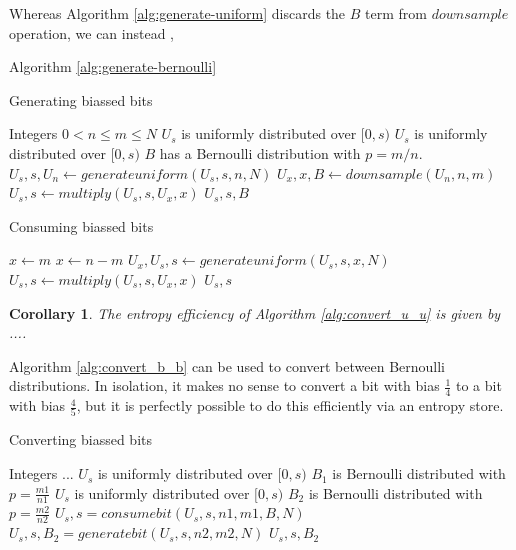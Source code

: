 \documentclass[12pt]{article}
\newtheorem{corollary}{Corollary}
\begin{document}
Whereas Algorithm \ref{alg:generate-uniform} discards the $B$ term from $downsample$ operation, we can instead , 

Algorithm \ref{alg:generate-bernoulli}

\begin{algorithm}
\caption{Generating biassed bits}
\label{alg:generate-bernoulli}
\begin{algorithmic}[1]
\Require Integers $0 < n \le m \le N$
\Require $U_s$ is uniformly distributed over $[0,s)$
\Ensure $U_s$ is uniformly distributed over $[0,s)$
\Ensure $B$ has a Bernoulli distribution with $p = m/n$.
    \State $U_s, s, U_n \gets generateuniform(U_s, s, n, N)$
    \State $U_x, x, B \gets downsample(U_n, n, m)$
    \State $U_s, s \gets multiply(U_s, s, U_x, x)$
    \State \Return $U_s, s, B$
\EndProcedure
\end{algorithmic}
\end{algorithm}

\begin{algorithm}
\caption{Consuming biassed bits}
\label{alg:consume_b}
\begin{algorithmic}[1]
        \State $x \gets m$
    \Else
        \State $x \gets n-m$
    \EndIf
    \State $U_x, U_s, s \gets generateuniform(U_s, s, x, N)$
    \State $U_s, s \gets multiply(U_s, s, U_x, x)$
    \State \Return $U_s, s$
\EndProcedure
\end{algorithmic}
\end{algorithm}

\begin{corollary}
The entropy efficiency of Algorithm \ref{alg:convert_u_u} is given by ....
\end{corollary}

Algorithm \ref{alg:convert_b_b} can be used to convert between Bernoulli distributions. In isolation, it makes no sense to convert a bit with bias $\frac{1}{4}$ to a bit with bias $\frac{4}{5}$, but it is perfectly possible to do this efficiently via an entropy store.

\begin{algorithm}
\caption{Converting biassed bits}
\label{alg:convert_b_b}
\begin{algorithmic}[1]
    \Require Integers ...
    \Require $U_s$ is uniformly distributed over $[0,s)$
    \Require $B_1$ is Bernoulli distributed with $p=\frac{m1}{n1}$
    \Ensure $U_s$ is uniformly distributed over $[0,s)$
    \Ensure $B_2$ is Bernoulli distributed with $p=\frac{m2}{n2}$
    \State $U_s, s = consumebit(U_s, s, n1, m1, B, N)$
    \State $U_s, s, B_2 = generatebit(U_s, s, n2, m2, N)$
    \State \Return $U_s, s, B_2$
\EndProcedure
\end{algorithmic}
\end{algorithm}
\end{document}
